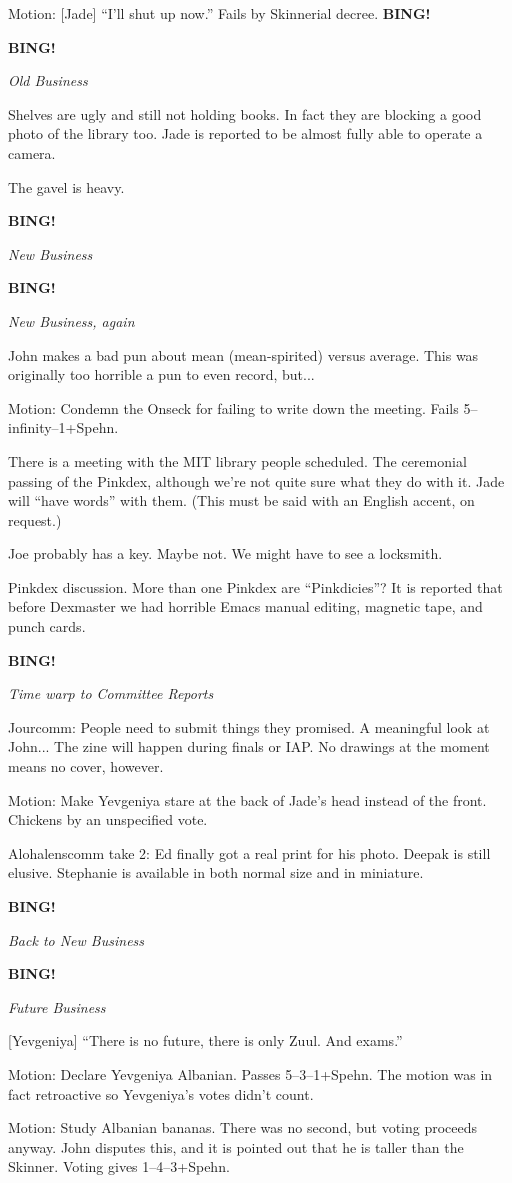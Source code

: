 \documentclass[12pt]{article}
\newcommand{\bing}{{\bf BING!} }
\newcommand{\goto}[1]{\bing \vskip 12pt \centerline{{\em{#1}}}}
\begin{document}
Motion: [Jade] ``I'll shut up now.''  Fails by Skinnerial decree.
\bing

\goto{Old Business}

Shelves are ugly and still not holding books.  In fact they are blocking
a good photo of the library too.  Jade is reported to be almost fully able
to operate a camera.

The gavel is heavy.

\goto{New Business}

\goto{New Business, again}

John makes a bad pun about mean (mean-spirited) versus average.  This was
originally too horrible a pun to even record, but...

Motion: Condemn the Onseck for failing to write down the meeting.  Fails
5--infinity--1+Spehn.

There is a meeting with the MIT library people scheduled.  The ceremonial
passing of the Pinkdex, although we're not quite sure what they do with
it.  Jade will ``have words'' with them.  (This must be said with an
English accent, on request.)

Joe probably has a key.  Maybe not.  We might have to see a locksmith.

Pinkdex discussion.  More than one Pinkdex are ``Pinkdicies''?  It is
reported that before Dexmaster we had horrible Emacs manual editing,
magnetic tape, and punch cards.

\goto{Time warp to Committee Reports}

Jourcomm: People need to submit things they promised.  A meaningful look
at John...  The zine will happen during finals or IAP.  No drawings at
the moment means no cover, however.

Motion: Make Yevgeniya stare at the back of Jade's head instead of the
front.  Chickens by an unspecified vote.

Alohalenscomm take 2: Ed finally got a real print for his photo.  Deepak
is still elusive.  Stephanie is available in both normal size and in
miniature.

\goto{Back to New Business}

\goto{Future Business}

[Yevgeniya] ``There is no future, there is only Zuul.  And exams.''

Motion: Declare Yevgeniya Albanian.  Passes 5--3--1+Spehn.  The motion
was in fact retroactive so Yevgeniya's votes didn't count.

Motion: Study Albanian bananas.  There was no second, but voting
proceeds anyway.  John disputes this, and it is pointed out that he is
taller than the Skinner.  Voting gives 1--4--3+Spehn.
\end{document}
